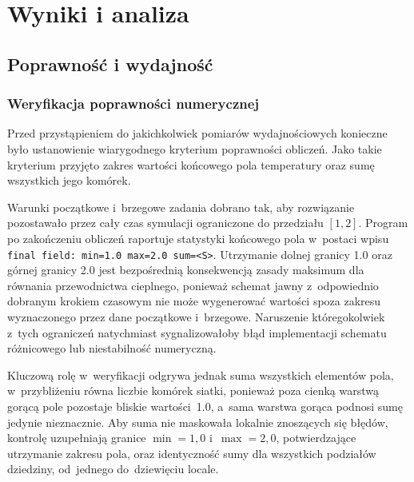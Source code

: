 \chapter{Wyniki i analiza}
\label{ch:wyniki}

\section{Poprawność i wydajność}
\label{sec:poprawnosc-wydajnosc}

\subsection{Weryfikacja poprawności numerycznej}
\label{subsec:poprawnosc}

Przed przystąpieniem do jakichkolwiek pomiarów wydajnościowych konieczne było
ustanowienie wiarygodnego kryterium poprawności obliczeń. Jako takie kryterium przyjęto zakres wartości końcowego pola temperatury oraz
sumę wszystkich jego komórek.

Warunki początkowe i~brzegowe zadania dobrano tak, aby rozwiązanie pozostawało
przez cały czas symulacji ograniczone do przedziału $[1,2]$. Program po
zakończeniu obliczeń raportuje statystyki końcowego pola w~postaci wpisu
\texttt{final field: min=1.0 max=2.0 sum=<S>}. Utrzymanie dolnej granicy
\num{1.0} oraz górnej granicy \num{2.0} jest bezpośrednią konsekwencją zasady
maksimum dla równania przewodnictwa cieplnego, ponieważ schemat jawny z~odpowiednio
dobranym krokiem czasowym nie może wygenerować wartości spoza zakresu
wyznaczonego przez dane początkowe i~brzegowe. Naruszenie któregokolwiek
z~tych ograniczeń natychmiast sygnalizowałoby błąd implementacji schematu
różnicowego lub niestabilność numeryczną.

Kluczową rolę w~weryfikacji odgrywa jednak suma wszystkich elementów pola,
w~przybliżeniu równa liczbie komórek siatki, ponieważ poza cienką warstwą gorącą pole pozostaje
bliskie wartości~\num{1.0}, a~sama warstwa gorąca podnosi sumę jedynie nieznacznie. Aby suma nie
maskowała lokalnie znoszących się błędów, kontrolę uzupełniają granice
\(\min=1{,}0\) i~\(\max=2{,}0\), potwierdzające utrzymanie zakresu pola, oraz
identyczność sumy dla wszystkich podziałów dziedziny, od~jednego do~dziewięciu locale.

